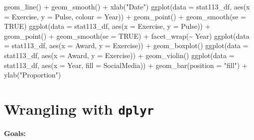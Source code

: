 \documentclass[
]{book}
\newenvironment{Shaded}{\begin{snugshade}}{\end{snugshade}}
\newcommand{\AttributeTok}[1]{\textcolor[rgb]{0.77,0.63,0.00}{#1}}
\newcommand{\ConstantTok}[1]{\textcolor[rgb]{0.00,0.00,0.00}{#1}}
\newcommand{\FunctionTok}[1]{\textcolor[rgb]{0.00,0.00,0.00}{#1}}
\newcommand{\NormalTok}[1]{#1}
\newcommand{\SpecialCharTok}[1]{\textcolor[rgb]{0.00,0.00,0.00}{#1}}
\newcommand{\StringTok}[1]{\textcolor[rgb]{0.31,0.60,0.02}{#1}}
\begin{document}
\begin{Shaded}
\begin{Highlighting}[]
  \FunctionTok{geom\_line}\NormalTok{() }\SpecialCharTok{+} \FunctionTok{geom\_smooth}\NormalTok{() }\SpecialCharTok{+} \FunctionTok{xlab}\NormalTok{(}\StringTok{"Date"}\NormalTok{)}
\FunctionTok{ggplot}\NormalTok{(}\AttributeTok{data =}\NormalTok{ stat113\_df, }\FunctionTok{aes}\NormalTok{(}\AttributeTok{x =}\NormalTok{ Exercise, }\AttributeTok{y =}\NormalTok{ Pulse,}
                           \AttributeTok{colour =}\NormalTok{ Year)) }\SpecialCharTok{+}
  \FunctionTok{geom\_point}\NormalTok{() }\SpecialCharTok{+}
  \FunctionTok{geom\_smooth}\NormalTok{(}\AttributeTok{se =} \ConstantTok{TRUE}\NormalTok{)}
\FunctionTok{ggplot}\NormalTok{(}\AttributeTok{data =}\NormalTok{ stat113\_df, }\FunctionTok{aes}\NormalTok{(}\AttributeTok{x =}\NormalTok{ Exercise, }\AttributeTok{y =}\NormalTok{ Pulse)) }\SpecialCharTok{+}
  \FunctionTok{geom\_point}\NormalTok{() }\SpecialCharTok{+}
  \FunctionTok{geom\_smooth}\NormalTok{(}\AttributeTok{se =} \ConstantTok{TRUE}\NormalTok{) }\SpecialCharTok{+}
  \FunctionTok{facet\_wrap}\NormalTok{(}\SpecialCharTok{\textasciitilde{}}\NormalTok{ Year)}
\FunctionTok{ggplot}\NormalTok{(}\AttributeTok{data =}\NormalTok{ stat113\_df, }\FunctionTok{aes}\NormalTok{(}\AttributeTok{x =}\NormalTok{ Award, }\AttributeTok{y =}\NormalTok{ Exercise)) }\SpecialCharTok{+}
  \FunctionTok{geom\_boxplot}\NormalTok{()}
\FunctionTok{ggplot}\NormalTok{(}\AttributeTok{data =}\NormalTok{ stat113\_df, }\FunctionTok{aes}\NormalTok{(}\AttributeTok{x =}\NormalTok{ Award, }\AttributeTok{y =}\NormalTok{ Exercise)) }\SpecialCharTok{+}
  \FunctionTok{geom\_violin}\NormalTok{()}
\FunctionTok{ggplot}\NormalTok{(}\AttributeTok{data =}\NormalTok{ stat113\_df, }\FunctionTok{aes}\NormalTok{(}\AttributeTok{x =}\NormalTok{ Year, }\AttributeTok{fill =}\NormalTok{ SocialMedia)) }\SpecialCharTok{+}
  \FunctionTok{geom\_bar}\NormalTok{(}\AttributeTok{position =} \StringTok{"fill"}\NormalTok{) }\SpecialCharTok{+}
  \FunctionTok{ylab}\NormalTok{(}\StringTok{"Proportion"}\NormalTok{)}
\end{Highlighting}
\end{Shaded}

\hypertarget{dplyr}{%
\chapter{\texorpdfstring{Wrangling with \texttt{dplyr}}{Wrangling with dplyr}}\label{dplyr}}

\textbf{Goals:}
\end{document}
